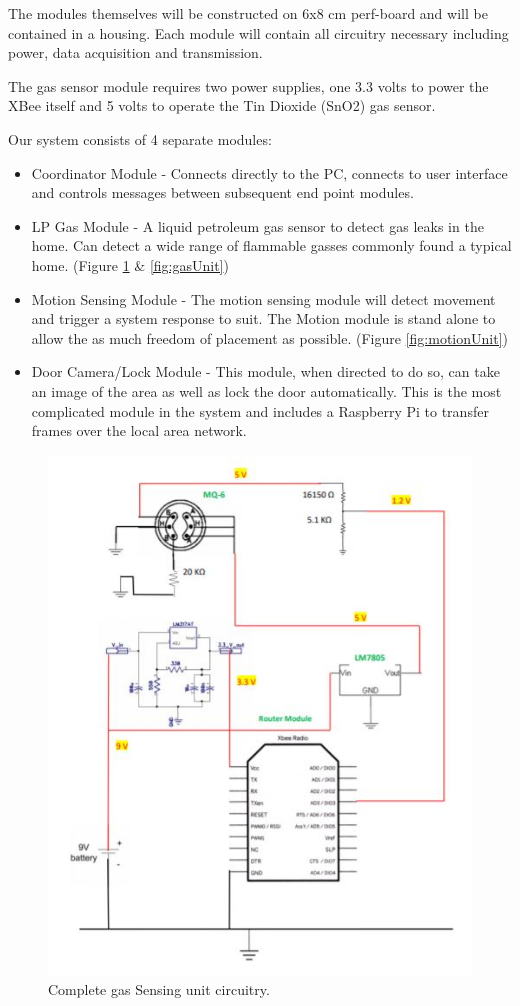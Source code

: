 	\par The modules themselves will be constructed on 6x8 cm perf-board and will be contained in a housing. Each module will contain all circuitry necessary including power, data acquisition and transmission. 

	\par The gas sensor module requires two power supplies, one 3.3 volts to power the XBee itself and 5 volts to operate the Tin Dioxide (SnO2) gas sensor. \\
	\par Our system consists of 4 separate modules:
	\begin{itemize}
		\item Coordinator Module - Connects directly to the PC, connects to user interface and controls messages between subsequent end point modules. 
		\item LP Gas Module - A liquid petroleum gas sensor to detect gas leaks in the home. Can detect a wide range of flammable gasses commonly found a typical home. (Figure \ref{fig:gasCirc} \& \ref{fig:gasUnit})
		\item Motion Sensing Module - The motion sensing module will detect movement and trigger a system response to suit. The Motion module is stand alone to allow the as much freedom of placement as possible. (Figure \ref{fig:motionUnit})
		\item Door Camera/Lock Module - This module, when directed to do so, can take an image of the area as well as lock the door automatically. This is the most complicated module in the system and includes a Raspberry Pi to transfer frames over the local area network.
	\end{itemize}
	\begin{figure}[h]
		\centering 
		\includegraphics[width=0.65\linewidth]{gasCircuit.JPG}
		\caption{Complete gas Sensing unit circuitry.}
		\label{fig:gasCirc}
	\end{figure}
